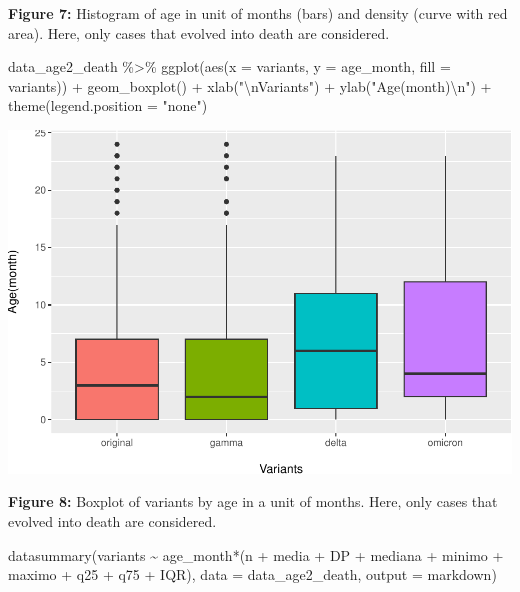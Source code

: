 \documentclass[
]{article}
\newenvironment{Shaded}{\begin{snugshade}}{\end{snugshade}}
\newcommand{\AttributeTok}[1]{\textcolor[rgb]{0.77,0.63,0.00}{#1}}
\newcommand{\FunctionTok}[1]{\textcolor[rgb]{0.00,0.00,0.00}{#1}}
\newcommand{\NormalTok}[1]{#1}
\newcommand{\SpecialCharTok}[1]{\textcolor[rgb]{0.00,0.00,0.00}{#1}}
\newcommand{\StringTok}[1]{\textcolor[rgb]{0.31,0.60,0.02}{#1}}
\renewenvironment{Shaded}{\begin{mdframed}[ backgroundcolor=shadecolor, linecolor = shadecolor, leftmargin=\dimexpr\leftmargin-2pt\relax, innerleftmargin=1.6pt, innertopmargin=5pt, skipabove=10pt,skipbelow=3pt ]}{\end{mdframed}}
\begin{document}
\textbf{Figure 7:} Histogram of age in unit of months (bars) and density
(curve with red area). Here, only cases that evolved into death are
considered.

\begin{Shaded}
\begin{Highlighting}[]
\NormalTok{data\_age2\_death }\SpecialCharTok{\%\textgreater{}\%} 
  \FunctionTok{ggplot}\NormalTok{(}\FunctionTok{aes}\NormalTok{(}\AttributeTok{x =}\NormalTok{ variants,}
             \AttributeTok{y =}\NormalTok{ age\_month,}
             \AttributeTok{fill =}\NormalTok{ variants)) }\SpecialCharTok{+}
  \FunctionTok{geom\_boxplot}\NormalTok{() }\SpecialCharTok{+}
  \FunctionTok{xlab}\NormalTok{(}\StringTok{"}\SpecialCharTok{\textbackslash{}n}\StringTok{Variants"}\NormalTok{) }\SpecialCharTok{+}
  \FunctionTok{ylab}\NormalTok{(}\StringTok{"Age(month)}\SpecialCharTok{\textbackslash{}n}\StringTok{"}\NormalTok{) }\SpecialCharTok{+}
  \FunctionTok{theme}\NormalTok{(}\AttributeTok{legend.position =} \StringTok{"none"}\NormalTok{)}
\end{Highlighting}
\end{Shaded}

\includegraphics{age_analysis_files/figure-latex/unnamed-chunk-16-1.pdf}

\textbf{Figure 8:} Boxplot of variants by age in a unit of months. Here,
only cases that evolved into death are considered.

\begin{Shaded}
\begin{Highlighting}[]
\FunctionTok{datasummary}\NormalTok{(variants }\SpecialCharTok{\textasciitilde{}}\NormalTok{ age\_month}\SpecialCharTok{*}\NormalTok{(n }\SpecialCharTok{+}\NormalTok{ media }\SpecialCharTok{+}\NormalTok{ DP }\SpecialCharTok{+}\NormalTok{ mediana }\SpecialCharTok{+}\NormalTok{ minimo }\SpecialCharTok{+}
\NormalTok{                                   maximo }\SpecialCharTok{+}\NormalTok{ q25 }\SpecialCharTok{+}\NormalTok{ q75 }\SpecialCharTok{+}\NormalTok{ IQR), }
            \AttributeTok{data =}\NormalTok{ data\_age2\_death, }\AttributeTok{output =} \StringTok{\textquotesingle{}markdown\textquotesingle{}}\NormalTok{)}
\end{Highlighting}
\end{Shaded}
\end{document}
